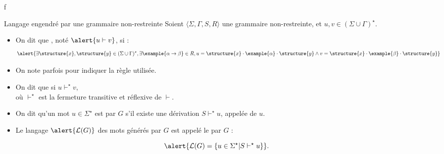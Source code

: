 f%

\begingroup

\begin{frame}{Langage engendré par une grammaire non-restreinte}
  Soient \alert{$\langle \Sigma, \Gamma, S, R \rangle$} une grammaire non-restreinte, et $u, v \in (\Sigma \cup \Gamma)^\star$. 
  \begin{itemize}
  \item On dit que , noté $\alert{u \vdash v}$, si :
    $$\alert{\exists \structure{x}, \structure{y} \in (\Sigma \cup \Gamma)^\star, \exists \example{\alpha \rightarrow \beta} \in R,
    u = \structure{x} \cdot \example{\alpha} \cdot \structure{y} \land v = \structure{x} \cdot \example{\beta} \cdot \structure{y}}$$

  \item On note parfois  pour indiquer la règle utilisée.

  \item On dit que  si \alert{$u \vdash^\star v$},\\
    où \alert{$\vdash^\star$ est la fermeture transitive et réflexive de $\vdash$}.

  \item On dit qu'un mot $u \in \Sigma^\star$ est  par $G$ s'il existe une dérivation $S \vdash^\star u$, appelée  de $u$. 
  \item Le langage $\alert{\mathcal{L}(G)}$ des mots générés par $G$ est appelé le  par $G$ :
  \end{itemize}
  $$\alert{\mathcal{L}(G) = \{u\in\Sigma^\star | S \vdash^\star u \}}.$$
\end{frame}
\endgroup
